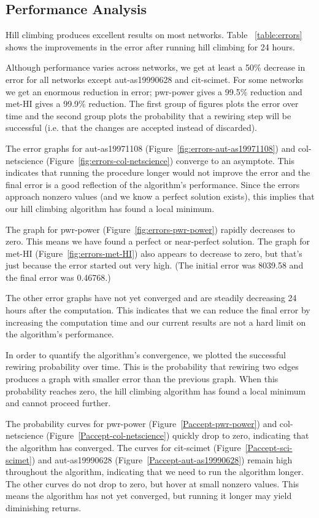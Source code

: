 \subsection{Performance Analysis}

Hill climbing produces excellent results on most networks.  Table ~\ref{table:errors} shows the improvements in the error after running hill climbing for 24 hours.

Although performance varies across networks, we get at least a 50\% decrease in error for all networks except aut-as19990628 and cit-scimet.  For some networks we get an enormous reduction in error; pwr-power gives a 99.5\% reduction and met-HI gives a 99.9\% reduction.  The first group of figures plots the error over time and the second group plots the probability that a rewiring step will be successful (i.e. that the changes are accepted instead of discarded).

The error graphs for aut-as19971108 (Figure~\ref{fig:errors-aut-as19971108}) and col-netscience (Figure~\ref{fig:errors-col-netscience}) converge to an asymptote.  This indicates that running the procedure longer would not improve the error and the final error is a good reflection of the algorithm's performance.  Since the errors approach nonzero values (and we know a perfect solution exists), this implies that our hill climbing algorithm has found a local minimum.

The graph for pwr-power (Figure~\ref{fig:errors-pwr-power}) rapidly decreases to zero.  This means we have found a perfect or near-perfect solution.  The graph for met-HI (Figure~\ref{fig:errors-met-HI}) also appears to decrease to zero, but that's just because the error started out very high.  (The initial error was 8039.58 and the final error was 0.46768.)

The other error graphs have not yet converged and are steadily decreasing 24 hours after the computation.  This indicates that we can reduce the final error by increasing the computation time and our current results are not a hard limit on the algorithm's performance.

In order to quantify the algorithm's convergence, we plotted the successful rewiring probability over time.  This is the probability that rewiring two edges produces a graph with smaller error than the previous graph.  When this probability reaches zero, the hill climbing algorithm has found a local minimum and cannot proceed further.

The probability curves for pwr-power (Figure~\ref{Paccept-pwr-power}) and col-netscience (Figure~\ref{Paccept-col-netscience}) quickly drop to zero, indicating that the algorithm has converged.  The curves for cit-scimet (Figure~\ref{Paccept-sci-scimet}) and aut-as19990628 (Figure~\ref{Paccept-aut-as19990628}) remain high throughout the algorithm, indicating that we need to run the algorithm longer.  The other curves do not drop to zero, but hover at small nonzero values.  This means the algorithm has not yet converged, but running it longer may yield diminishing returns.

